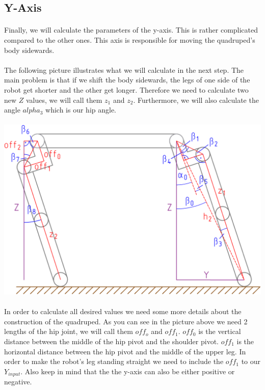 \documentclass{article}
\begin{document}
    \subsection{Y-Axis}
    \paragraph{} 
    Finally, we will calculate the parameters of the y-axis. This is rather complicated compared to the other ones. This axis is responsible for moving the quadruped's body sidewards.
    
    \paragraph{}
    The following picture illustrates what we will calculate in the next step. The main problem is that if we shift the body sidewards, the legs of one side of the robot get shorter and the other get longer. Therefore we need to calculate two new $Z$ values, we will call them $z_1$ and $z_2$. Furthermore, we will also calculate the angle $alpha_3$ which is our hip angle.

    \paragraph{}
    \includegraphics[scale=0.2]{y-axis}

    \paragraph{}
    In order to calculate all desired values we need some more details about the construction of the quadruped. As you can see in the picture above we need 2 lengths of the hip joint, we will call them $off_o$ and $off_1$. $off_0$ is the vertical distance between the middle of the hip pivot and the shoulder pivot. $off_1$ is the horizontal distance between the hip pivot and the middle of the upper leg. In order to make the robot's leg standing straight we need to include the $off_1$ to our $Y_{input}$. Also keep in mind that the the y-axis can also be either positive or negative.
\end{document}
